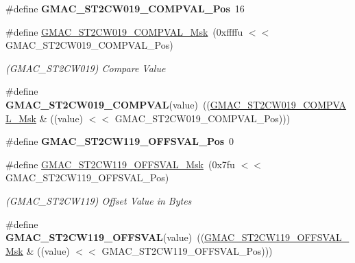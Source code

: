 \begin{DoxyCompactItemize}
\item 
\mbox{\label{group__SAMV71__GMAC_ga8e3060fae26eff672ab1f18c3f7d0eef}} 
\#define {\bfseries G\+M\+A\+C\+\_\+\+S\+T2\+C\+W019\+\_\+\+C\+O\+M\+P\+V\+A\+L\+\_\+\+Pos}~16
\item 
\mbox{\label{group__SAMV71__GMAC_gadcf30345a07dd061359226a80b5f44c0}} 
\#define \mbox{\hyperlink{group__SAMV71__GMAC_gadcf30345a07dd061359226a80b5f44c0}{G\+M\+A\+C\+\_\+\+S\+T2\+C\+W019\+\_\+\+C\+O\+M\+P\+V\+A\+L\+\_\+\+Msk}}~(0xffffu $<$$<$ G\+M\+A\+C\+\_\+\+S\+T2\+C\+W019\+\_\+\+C\+O\+M\+P\+V\+A\+L\+\_\+\+Pos)
\begin{DoxyCompactList}\small\item\em (G\+M\+A\+C\+\_\+\+S\+T2\+C\+W019) Compare Value \end{DoxyCompactList}\item 
\mbox{\label{group__SAMV71__GMAC_gaacbe7ca5a3f49b1b83ed8da2b7d8671a}} 
\#define {\bfseries G\+M\+A\+C\+\_\+\+S\+T2\+C\+W019\+\_\+\+C\+O\+M\+P\+V\+AL}(value)~((\mbox{\hyperlink{group__SAMV71__GMAC_gadcf30345a07dd061359226a80b5f44c0}{G\+M\+A\+C\+\_\+\+S\+T2\+C\+W019\+\_\+\+C\+O\+M\+P\+V\+A\+L\+\_\+\+Msk}} \& ((value) $<$$<$ G\+M\+A\+C\+\_\+\+S\+T2\+C\+W019\+\_\+\+C\+O\+M\+P\+V\+A\+L\+\_\+\+Pos)))
\item 
\mbox{\label{group__SAMV71__GMAC_ga085476f33b2de0d7a6acc78bb2274812}} 
\#define {\bfseries G\+M\+A\+C\+\_\+\+S\+T2\+C\+W119\+\_\+\+O\+F\+F\+S\+V\+A\+L\+\_\+\+Pos}~0
\item 
\mbox{\label{group__SAMV71__GMAC_ga8acadd4c964c7e746cab7ab34153fdb1}} 
\#define \mbox{\hyperlink{group__SAMV71__GMAC_ga8acadd4c964c7e746cab7ab34153fdb1}{G\+M\+A\+C\+\_\+\+S\+T2\+C\+W119\+\_\+\+O\+F\+F\+S\+V\+A\+L\+\_\+\+Msk}}~(0x7fu $<$$<$ G\+M\+A\+C\+\_\+\+S\+T2\+C\+W119\+\_\+\+O\+F\+F\+S\+V\+A\+L\+\_\+\+Pos)
\begin{DoxyCompactList}\small\item\em (G\+M\+A\+C\+\_\+\+S\+T2\+C\+W119) Offset Value in Bytes \end{DoxyCompactList}\item 
\mbox{\label{group__SAMV71__GMAC_ga996e67c23d2b8f02918fde77c22cc99a}} 
\#define {\bfseries G\+M\+A\+C\+\_\+\+S\+T2\+C\+W119\+\_\+\+O\+F\+F\+S\+V\+AL}(value)~((\mbox{\hyperlink{group__SAMV71__GMAC_ga8acadd4c964c7e746cab7ab34153fdb1}{G\+M\+A\+C\+\_\+\+S\+T2\+C\+W119\+\_\+\+O\+F\+F\+S\+V\+A\+L\+\_\+\+Msk}} \& ((value) $<$$<$ G\+M\+A\+C\+\_\+\+S\+T2\+C\+W119\+\_\+\+O\+F\+F\+S\+V\+A\+L\+\_\+\+Pos)))

\end{DoxyCompactItemize}
